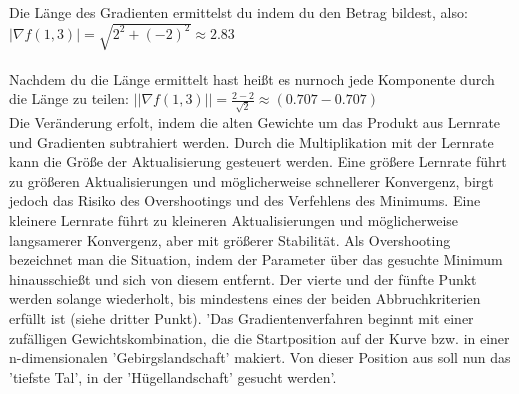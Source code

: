   Die Länge des Gradienten ermittelst du indem du den Betrag bildest, also:
  \newline $|\nabla f(1,3)| = \sqrt{2^2 + (-2)^2} \approx 2.83$
\\
\\
Nachdem du die Länge ermittelt hast heißt es nurnoch jede Komponente durch die Länge zu teilen:
  $||\nabla f(1,3)|| = \frac{2 - 2}{\sqrt{2}} \approx (0.707 - 0.707)$
\\
\newpage
Die Veränderung erfolt, indem die alten Gewichte um das Produkt aus Lernrate und Gradienten subtrahiert werden. Durch die Multiplikation mit der Lernrate kann die Größe der Aktualisierung gesteuert werden.
  Eine größere Lernrate führt zu größeren Aktualisierungen und möglicherweise schnellerer Konvergenz, birgt jedoch das Risiko des Overshootings und des Verfehlens des Minimums.
  Eine kleinere Lernrate führt zu kleineren Aktualisierungen und möglicherweise langsamerer Konvergenz, aber mit größerer Stabilität. 
Als Overshooting bezeichnet man die Situation, indem der Parameter über das gesuchte Minimum hinausschießt und sich von diesem entfernt.
Der vierte und der fünfte Punkt werden solange wiederholt, bis mindestens eines der beiden Abbruchkriterien erfüllt ist (siehe dritter Punkt).
  'Das Gradientenverfahren beginnt mit einer zufälligen Gewichtskombination, die die Startposition auf der Kurve bzw. in einer n-dimensionalen 'Gebirgslandschaft' makiert.
  Von dieser Position aus soll nun das 'tiefste Tal', in der 'Hügellandschaft' gesucht werden'\cite{GR10}.
  
\fi

\iffalse
